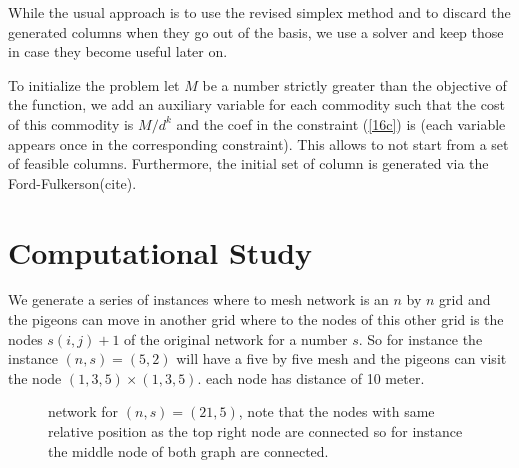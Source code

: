 \documentclass{article}
\begin{document}
	While the usual approach is to use the revised simplex method and to discard the generated columns when they go out of the basis, we use a solver and keep those in case they become useful later on. 
	
	To initialize the problem let $M$ be a number strictly greater than the objective of the function, we add an auxiliary variable for each commodity such that the cost of this commodity is $M/d^k$ and the coef in the constraint (\ref{16c}) is (each variable appears once in the corresponding constraint). This allows to not start from a set of feasible columns. Furthermore, the initial set of column is generated via the Ford-Fulkerson(cite). 
	
	\section{Computational Study}
	
	We generate a series of instances where to mesh network is an $n$ by $n$ grid and the pigeons can move in another grid where to the nodes of this other grid is the nodes $s(i, j) + 1$ of the original network for a number $s$. So for instance the instance $(n, s)=(5, 2)$ will have a five by five mesh and the pigeons can visit the node $(1, 3, 5) \times (1, 3, 5)$.  each node has distance of 10 meter.
	
	\begin{figure}[h]
		\centering
		\qquad
		\caption{network for $(n, s) = (21, 5)$, note that the nodes with same relative position as the top right node are connected so for instance the middle node of both graph are connected.}
	\end{figure}
	
\end{document}
